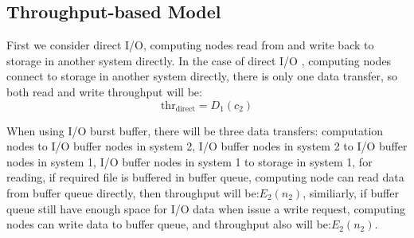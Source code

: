 \subsection{Throughput-based Model}
First we consider direct I/O, computing nodes read from and write back to storage in another system directly.
In the case of direct I/O , computing nodes connect to storage in another system directly, there is only one data transfer, so both read and write throughput  will be:%
\begin{equation}
	\text{thr}_{\text{direct}}=D_1(c_2) \label{throughput1}
\end{equation}

When using I/O burst buffer, there will be three data transfers: computation nodes to I/O buffer nodes in system 2, I/O buffer nodes in system 2 to I/O buffer nodes in system 1, I/O buffer nodes in system 1 to storage in system 1, 
for reading, if required file is buffered in buffer queue, computing node can read data from buffer queue directly, then throughput will be:$E_2(n_2)$, similiarly, if buffer queue still have enough space for I/O data when issue a write request, computing nodes can write data to buffer queue, and throughput also will be:$E_2(n_2)$.


